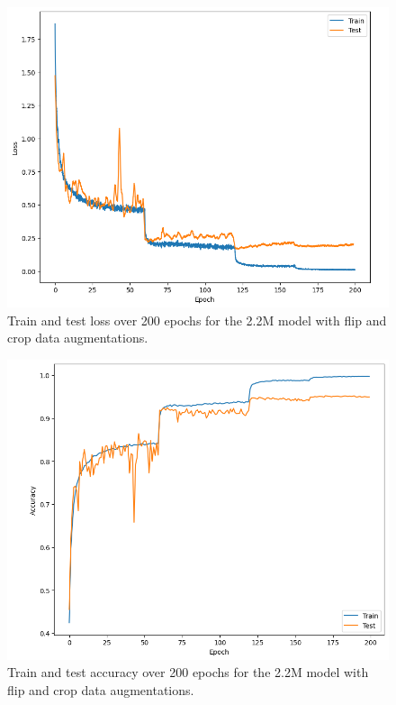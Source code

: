 \documentclass[letterpaper]{article} %
\begin{document}
\begin{figure}[t]
\centering
\includegraphics[width=0.95\columnwidth]{loss_2M.png}
\caption{Train and test loss over 200 epochs for the 2.2M model with flip and crop data augmentations.}
\label{fig1}
\end{figure}

\begin{figure}[t]
\centering
\includegraphics[width=0.95\columnwidth]{accuracy_2M.png}
\caption{Train and test accuracy over 200 epochs for the 2.2M model with flip and crop data augmentations.}
\label{fig2}
\end{figure}
\end{document}

